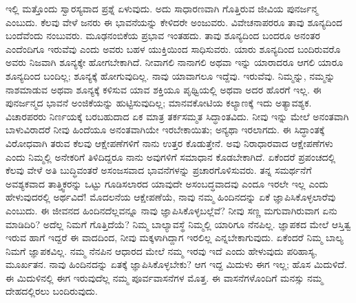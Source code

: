 ಇಲ್ಲಿ ಮತ್ತೊಂದು ಸ್ವಾರಸ್ಯವಾದ ಪ್ರಶ್ನೆ ಏಳುವುದು. ಅದು ಸಾಧಾರಣವಾಗಿ ಗೊತ್ತಿರುವ ಜೀವಿಯ ಪುನರ್ಜನ್ಮ ಎಂಬುದು. ಕೆಲವು ವೇಳೆ ಜನರು ಈ ಭಾವನೆಯನ್ನು ಕೇಳಿದರೇ ಅಂಜುವರು. ವಿವೇಚನಾಪರರೂ ತಾವು ಶೂನ್ಯದಿಂದ ಬಂದೆವೆಂದು ನಂಬುವರು. ಮೂಢನಂಬಿಕೆಯ ಪ್ರಭಾವ ಇಂತಹದು. ತಾವು ಶೂನ್ಯದಿಂದ ಬಂದರೂ ಅನಂತರ ಎಂದೆಂದಿಗೂ ಇರುವೆವು ಎಂದು ಅವರು ಬಹಳ ಯುಕ್ತಿಯಿಂದ ಸಾಧಿಸುವರು. ಯಾರು ಶೂನ್ಯದಿಂದ ಬಂದಿರುವರೊ ಅವರು ನಿಜವಾಗಿ ಶೂನ್ಯಕ್ಕೇ ಹೋಗಬೇಕಾಗಿದೆ. ನೀವಾಗಲಿ ನಾನಾಗಲಿ ಅಥವಾ ಇನ್ನು ಯಾರಾದರೂ ಆಗಲಿ ಯಾರೂ ಶೂನ್ಯದಿಂದ ಬಂದಿಲ್ಲ; ಶೂನ್ಯಕ್ಕೆ ಹೋಗುವುದಿಲ್ಲ. ನಾವು ಯಾವಾಗಲೂ ಇದ್ದೆವು. ಇರುವೆವು. ನಿಮ್ಮನ್ನು, ನಮ್ಮನ್ನು ನಾಶಮಾಡುವ ಅಥವಾ ಶೂನ್ಯಕ್ಕೆ ಕಳಿಸುವ ಯಾವ ಶಕ್ತಿಯೂ ಪೃಥ್ವಿಯಲ್ಲಿ ಅಥವಾ ಅದರ ಹೊರಗೆ ಇಲ್ಲ. ಈ ಪುನರ್ಜನ್ಮದ ಭಾವನೆ ಅಂಜಿಕೆಯನ್ನು ಹುಟ್ಟಿಸುವುದಿಲ್ಲ; ಮಾನವಕೋಟಿಯ ಕಲ್ಯಾಣಕ್ಕೆ ಇದು ಅತ್ಯಾವಶ್ಯಕ. ವಿಚಾರಪರರು ನಿರ್ಣಯಕ್ಕೆ ಬರಬಹುದಾದ ಏಕ ಮಾತ್ರ ತರ್ಕಸಮ್ಮತ ಸಿದ್ಧಾಂತವಿದು. ನೀವು ಇನ್ನು ಮೇಲೆ ಅನಂತವಾಗಿ ಬಾಳುವಿರಾದರೆ ನೀವು ಹಿಂದೆಯೂ ಅನಂತವಾಗಿಯೇ ಇರಬೇಕಾಯಿತು; ಅನ್ಯಥಾ ಇರಲಾಗದು. ಈ ಸಿದ್ಧಾಂತಕ್ಕೆ ವಿರೋಧವಾಗಿ ತರುವ ಕೆಲವು ಆಕ್ಷೇಪಣೆಗಳಿಗೆ ನಾನು ಉತ್ತರ ಕೊಡುತ್ತೇನೆ. ಅವು ನಿರಾಧಾರವಾದ ಆಕ್ಷೇಪಣೆಗಳು ಎಂದು ನಿಮ್ಮಲ್ಲಿ ಅನೇಕರಿಗೆ ತಿಳಿದಿದ್ದರೂ ನಾನು ಅವುಗಳಿಗೆ ಸಮಾಧಾನ ಕೊಡಬೇಕಾಗಿದೆ. ಏಕೆಂದರೆ ಪ್ರಪಂಚದಲ್ಲಿ ಕೆಲವು ವೇಳೆ ಅತಿ ಬುದ್ಧಿವಂತರೆ ಅಸಂಜಸವಾದ ಭಾವನೆಗಳನ್ನು ಪ್ರಚಾರಗೊಳಿಸುವರು. ತನ್ನ ಸಮರ್ಥನೆಗೆ ಅವಶ್ಯಕವಾದ ತಾತ್ತ್ವಿಕರನ್ನು ಒಟ್ಟು ಗೂಡಿಸಲಾರದ ಯಾವುದೇ ಅಸಂಬದ್ಧವಾದವು ಎಂದೂ ಇರಲೇ ಇಲ್ಲ ಎಂದು ಹೇಳುವುದರಲ್ಲಿ ಅರ್ಥವಿದೆ! ಮೊದಲನೆಯ ಆಕ್ಷೇಪಣೆಯೆ, ನಾವು ನಮ್ಮ ಹಿಂದಿನದನ್ನು ಏಕೆ ಜ್ಞಾಪಿಸಿಕೊಳ್ಳಲಾರೆವು ಎಂಬುದು. ಈ ಜೀವನದ ಹಿಂದಿನದೆಲ್ಲವನ್ನೂ ನಾವು ಜ್ಞಾಪಿಸಿಕೊಳ್ಳಬಲ್ಲೆವೆ? ನೀವು ಸಣ್ಣ ಮಗುವಾಗಿರುವಾಗ ಏನು ಮಾಡಿದಿರಿ? ಅದೆಲ್ಲ ನಿಮಗೆ ಗೊತ್ತಿದೆಯೆ? ನಿಮ್ಮ ಬಾಲ್ಯಾವಸ್ಥೆ ನಿಮ್ಮಲ್ಲಿ ಯಾರಿಗೂ ನೆನಪಿಲ್ಲ. ಜ್ಞಾಪಕದ ಮೇಲೆ ಆಸ್ತಿತ್ವ ಇರುವ ಹಾಗೆ ಇದ್ದರೆ ಈ ವಾದದಿಂದ, ನೀವು ಮಕ್ಕಳಾಗಿದ್ದಾಗ ಇರಲಿಲ್ಲ ಎನ್ನಬೇಕಾಗುವುದು. ಏಕೆಂದರೆ ನಿಮ್ಮ ಬಾಲ್ಯ ನಿಮಗೆ ಜ್ಞಾಪಕವಿಲ್ಲ. ನಮ್ಮ ನೆನಪಿನ ಆಧಾರದ ಮೇಲೆ ನಮ್ಮ ಇರವು ಇದೆ ಎಂದು ಹೇಳುವುದು ಪರಿಹಾಸ್ಯ, ಮೂರ್ಖತನ. ನಾವು ಹಿಂದಿನದನ್ನು ಏತಕ್ಕೆ ಜ್ಞಾಪಿಸಿಕೊಳ್ಳಬೇಕು? ಆಗ ಇದ್ದ ಮಿದುಳು ಈಗ ಇಲ್ಲ; ಹೊಸ ಮಿದುಳಿದೆ. ಈ ಮಿದುಳಿನಲ್ಲಿ ಈಗ ಇರುವುದೆಲ್ಲ ನಮ್ಮ ಪೂರ್ವವಾಸನೆಗಳ ಮೊತ್ತ. ಈ ವಾಸನೆಗಳೊಂದಿಗೆ ಮನಸ್ಸು ನಮ್ಮ ದೇಹದಲ್ಲಿರಲು ಬಂದಿರುವುದು.

